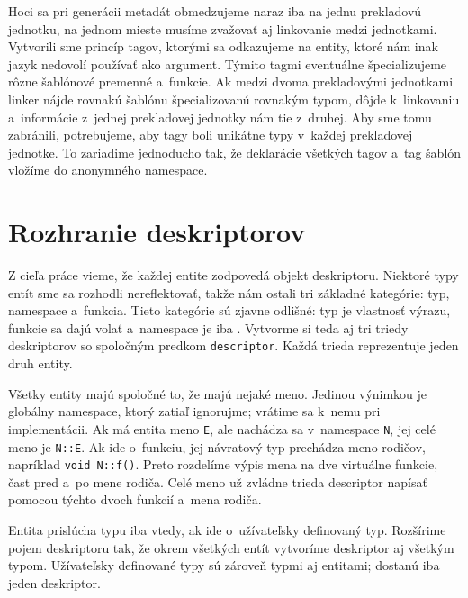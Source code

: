 Hoci sa pri generácii metadát obmedzujeme naraz iba na jednu prekladovú jednotku, na jednom mieste musíme zvažovať aj linkovanie medzi jednotkami. Vytvorili sme princíp tagov, ktorými sa odkazujeme na entity, ktoré nám inak jazyk nedovolí používať ako argument. Týmito tagmi eventuálne špecializujeme rôzne šablónové premenné a~funkcie. Ak medzi dvoma prekladovými jednotkami linker nájde rovnakú šablónu špecializovanú rovnakým typom, dôjde k~linkovaniu a~informácie z~jednej prekladovej jednotky nám  tie z~druhej. Aby sme tomu zabránili, potrebujeme, aby tagy boli unikátne typy v~každej prekladovej jednotke. To zariadime jednoducho tak, že deklarácie všetkých tagov a~tag šablón vložíme do anonymného namespace.

\section{Rozhranie deskriptorov}

Z cieľa práce vieme, že každej entite zodpovedá objekt deskriptoru. Niektoré typy entít sme sa rozhodli nereflektovať, takže nám ostali tri základné kategórie: typ, namespace a~funkcia. Tieto kategórie sú zjavne odlišné: typ je vlastnosť výrazu, funkcie sa dajú volať a~namespace je iba . Vytvorme si teda aj tri triedy deskriptorov so spoločným predkom \texttt{descriptor}. Každá trieda reprezentuje jeden druh entity.

Všetky entity majú spoločné to, že majú nejaké meno. Jedinou výnimkou je globálny namespace, ktorý zatiaľ ignorujme; vrátime sa k~nemu pri implementácii. Ak má entita meno \texttt{E}, ale nachádza sa v~namespace \texttt{N}, jej celé meno je \texttt{N::E}. Ak ide o~funkciu, jej návratový typ prechádza meno rodičov, napríklad \texttt{void N::f()}. Preto rozdelíme výpis mena na dve virtuálne funkcie, čast pred a~po mene rodiča. Celé meno už zvládne trieda descriptor napísať pomocou týchto dvoch funkcií a~mena rodiča.

Entita prislúcha typu iba vtedy, ak ide o~užívateľsky definovaný typ. Rozšírime pojem deskriptoru tak, že okrem všetkých entít vytvoríme deskriptor aj všetkým typom. Užívateľsky definované typy sú zároveň typmi aj entitami; dostanú iba jeden deskriptor.

